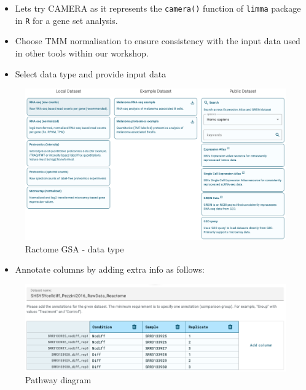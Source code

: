 \documentclass[
]{book}
\providecommand{\tightlist}{%
  \setlength{\itemsep}{0pt}\setlength{\parskip}{0pt}}
\begin{document}
\begin{itemize}
\item
  Lets try CAMERA as it represents the \texttt{camera()} function of \texttt{limma} package in \texttt{R} for a gene set analysis.
\item
  Choose TMM normalisation to ensure consistency with the input data used in other tools within our workshop.
\item
  Select data type and provide input data
\end{itemize}

\begin{figure}

{\centering \includegraphics[width=1\linewidth]{images/reactome-gsea-select-data} 

}

\caption{Ractome GSA - data type}\label{fig:unnamed-chunk-30}
\end{figure}

\begin{itemize}
\tightlist
\item
  Annotate columns by adding extra info as follows:
\end{itemize}

\begin{figure}

{\centering \includegraphics[width=1\linewidth]{images/reactome-gsea-add-column} 

}

\caption{Pathway diagram }\label{fig:unnamed-chunk-31}
\end{figure}
\end{document}

